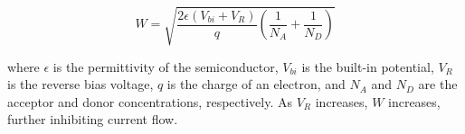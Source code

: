 \[
W = \sqrt{\frac{2 \epsilon (V_{bi} + V_R)}{q} \left( \frac{1}{N_A} + \frac{1}{N_D} \right)}
\]

where \( \epsilon \) is the permittivity of the semiconductor, \( V_{bi} \) is the built-in potential, \( V_R \) is the reverse bias voltage, \( q \) is the charge of an electron, and \( N_A \) and \( N_D \) are the acceptor and donor concentrations, respectively. As \( V_R \) increases, \( W \) increases, further inhibiting current flow.

